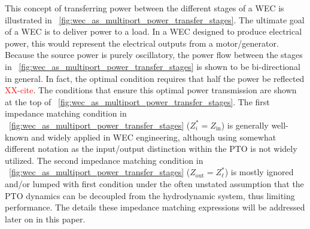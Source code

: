 \documentclass[lettersize,journal]{IEEEtran}
\newcommand{\rc}[1]{\textcolor{red}{#1}}
\begin{document}
This concept of transferring power between the different stages of a WEC is illustrated in \figurename~\ref{fig:wec_as_multiport_power_transfer_stages}.
The ultimate goal of a WEC is to deliver power to a load.
In a WEC designed to produce electrical power, this would represent the electrical outputs from a motor/generator.
Because the source power is purely oscillatory, the power flow between the stages in \figurename~\ref{fig:wec_as_multiport_power_transfer_stages} is shown to be bi-directional in general.
In fact, the optimal condition requires that half the power be reflected \rc{XX-cite}\cite{Evans1976}.
The conditions that ensure this optimal power transmission are shown at the top of \figurename~\ref{fig:wec_as_multiport_power_transfer_stages}.
The first impedance matching condition in \figurename~\ref{fig:wec_as_multiport_power_transfer_stages} ($Z_i^* = Z_{\textrm{in}}$) is generally well-known and widely applied in WEC engineering, although using somewhat different notation as the input/output distinction within the PTO is not widely utilized.
The second impedance matching condition in \figurename~\ref{fig:wec_as_multiport_power_transfer_stages} ($Z_{\textrm{out}} = Z_\ell^*$) is mostly ignored and/or lumped with first condition under the often unstated assumption that the PTO dynamics can be decoupled from the hydrodynamic system, thus limiting performance.
The details these impedance matching expressions will be addressed later on in this paper.
\end{document}
